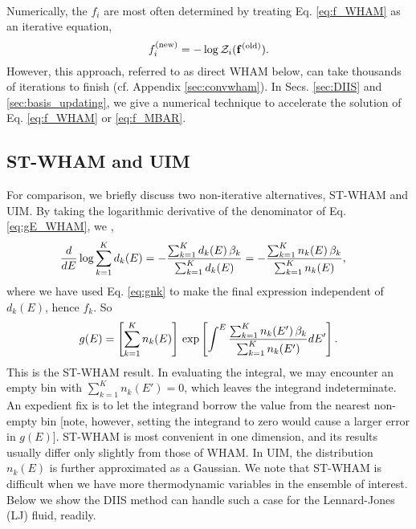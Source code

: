 \documentclass{gMOS2e}
\begin{document}
\paragraph*{}



Numerically, the
$f_i$ are most often determined by treating Eq. \eqref{eq:f_WHAM}
as an iterative equation,
%
\begin{equation*}
f_i^\mathrm{(new)}
=
-\log \mathcal{Z}_i( \mathbf{f}^\mathrm{(old)} ).
\end{equation*}
%
However, this approach, referred to as direct WHAM below,
can take thousands of iterations to finish\cite{
bereau2009, kim2011, zhu2012}
(cf. Appendix \ref{sec:convwham}).
%
In Secs. \ref{sec:DIIS} and \ref{sec:basis_updating},
we give a numerical technique to
accelerate the solution
of Eq. \eqref{eq:f_WHAM} or \eqref{eq:f_MBAR}.





\subsection{ST-WHAM and UIM}



For comparison,
we briefly discuss
two non-iterative alternatives, ST-WHAM\cite{
fenwick2008, kim2011}
and UIM\cite{
kastner2005, kastner2009}.
%
By taking the logarithmic derivative of
the denominator of Eq. \eqref{eq:gE_WHAM},
we ,
%
\begin{align}
\frac{d}{dE}
\log
  \sum_{k = 1}^K d_k(E)
&=
-
\frac{
  \sum_{k = 1}^K d_k(E) \, \beta_k
}
{
  \sum_{k = 1}^K d_k(E)
}
=
-
\frac{
  \sum_{k = 1}^K n_k(E) \, \beta_k
}
{
  \sum_{k = 1}^K n_k(E)
},
\notag
\end{align}
%
{
where
we have used Eq. \eqref{eq:gnk}
to make the final expression
independent of $d_k(E)$, hence $f_k$.
}
%
So
\begin{align}
g(E)
=
\left[
  \sum_{k = 1}^K n_k(E)
\right]
\,
\exp
\left[
\int^E
    \frac{ \sum_{k = 1}^K n_k(E') \, \beta_k }
         { \sum_{k = 1}^K n_k(E') }
  dE'
\right].
\notag
\end{align}
%
This is the ST-WHAM result.
%
In evaluating the integral,
we may encounter an empty bin
with $\sum_{k = 1}^K n_k(E') = 0$,
which leaves the integrand indeterminate.
%
An expedient fix is to let the integrand borrow
the value from the nearest non-empty bin
%
[note, however, setting the integrand to zero
would cause a larger error in $g(E)$].
%
ST-WHAM is most convenient in one dimension,
and its results usually differ only slightly
from those of WHAM\cite{kim2011}.
%
In UIM\cite{
kastner2005, kastner2009},
the distribution $n_k(E)$
is further approximated as a Gaussian.
%
We note that ST-WHAM is difficult when we have more
thermodynamic variables in the ensemble of interest.
%
Below we show  the DIIS method can
handle such a case
for the Lennard-Jones (LJ) fluid, readily.
\end{document}
